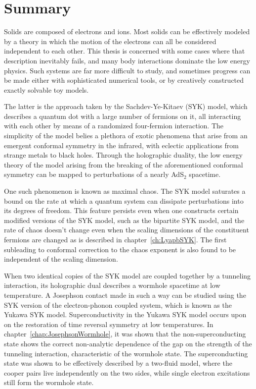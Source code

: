 \newpage
\thispagestyle{empty}

\chapter*{Summary}
\label{Summary}

Solids are composed of electrons and ions. Most solids can be effectively modeled by a theory in which the motion of the electrons can all be considered independent to each other. This thesis is concerned with some cases where that description inevitably fails, and many body interactions dominate the low energy physics. Such systems are far more difficult to study, and sometimes progress can be made either with sophisticated numerical tools, or by creatively constructed exactly solvable toy models.
\par
The latter is the approach taken by the Sachdev-Ye-Kitaev (SYK) model, which describes a quantum dot with a large number of fermions on it, all interacting with each other by means of a randomized four-fermion interaction. The simplicity of the model belies a plethora of exotic phenomena that arise from an emergent conformal symmetry in the infrared, with eclectic applications from strange metals to black holes. Through the holographic duality, the low energy theory of the model arising from the breaking of the aforementioned conformal symmetry can be mapped to perturbations of a nearly AdS${}_2$ spacetime. 
\par
One such phenomenon is known as maximal chaos. The SYK model saturates a bound on the rate at which a quantum system can dissipate perturbations into its degrees of freedom. This feature persists even when one constructs certain modified versions of the SYK model, such as the bipartite SYK model, and the rate of chaos doesn't change even when the scaling dimensions of the constituent fermions are changed as is described in chapter~\ref{ch:LyapbSYK}. The first subleading to conformal correction to the chaos exponent is also found to be independent of the scaling dimension. 
\par
When two identical copies of the SYK model are coupled together by a tunneling interaction, its holographic dual describes a wormhole spacetime at low temperature. A Josephson contact made in such a way can be studied using the SYK version of the electron-phonon coupled system, which is known as the Yukawa SYK model. Superconductivity in the Yukawa SYK model occurs upon on the restoration of time reversal symmetry at low temperatures. In chapter~\ref{chap:JosephsonWormhole}, it was shown that the non-superconducting state shows the correct non-analytic dependence of the gap on the strength of the tunneling interaction, characteristic of the wormhole state. The superconducting state was shown to be effectively described by a two-fluid model, where the cooper pairs live independently on the two sides, while single electron excitations still form the wormhole state. 
